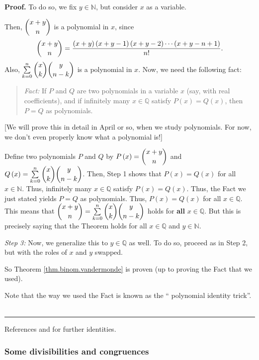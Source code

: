 \documentclass[numbers=enddot,12pt,final,onecolumn,notitlepage]{scrartcl}%
\numberwithin{exer}{subsection}
\theoremstyle{definition}
\newenvironment{statement}{\begin{quote}}{\end{quote}}
\newenvironment{proof}[1][Proof]{\noindent\textbf{#1.} }{\ \rule{0.5em}{0.5em}}
\let\sumnonlimits\sum
\renewcommand{\sum}{\sumnonlimits\limits}
\begin{document}
\begin{proof}
To do so, we fix $y\in\mathbb{N}$, but consider $x$ as a variable.

Then, $\dbinom{x+y}{n}$ is a polynomial in $x$, since%
\[
\dbinom{x+y}{n}=\dfrac{\left(  x+y\right)  \left(  x+y-1\right)  \left(
x+y-2\right)  \cdots\left(  x+y-n+1\right)  }{n!}.
\]
Also, $\sum\limits_{k=0}^{n}\dbinom{x}{k}\dbinom{y}{n-k}$ is a polynomial in
$x$. Now, we need the following fact:

\begin{statement}
\textit{Fact:} If $P$ and $Q$ are two polynomials in a variable $x$ (say, with
real coefficients), and if infinitely many $x\in\mathbb{Q}$ satisfy $P\left(
x\right)  =Q\left(  x\right)  $, then $P=Q$ as polynomials.
\end{statement}

[We will prove this in detail in April or so, when we study polynomials. For
now, we don't even properly know what a polynomial is!]

Define two polynomials $P$ and $Q$ by $P\left(  x\right)  =\dbinom{x+y}{n}$
and $Q\left(  x\right)  =\sum_{k=0}^{n}\dbinom{x}{k}\dbinom{y}{n-k}$. Then,
Step 1 shows that $P\left(  x\right)  =Q\left(  x\right)  $ for all
$x\in\mathbb{N}$. Thus, infinitely many $x\in\mathbb{Q}$ satisfy $P\left(
x\right)  =Q\left(  x\right)  $. Thus, the Fact we just stated yields $P=Q$ as
polynomials. Thus, $P\left(  x\right)  =Q\left(  x\right)  $ for all
$x\in\mathbb{Q}$. This means that $\dbinom{x+y}{n}=\sum\limits_{k=0}%
^{n}\dbinom{x}{k}\dbinom{y}{n-k}$ holds for \textbf{all} $x\in\mathbb{Q}$. But
this is precisely saying that the Theorem holds for all $x\in\mathbb{Q}$ and
$y\in\mathbb{N}$.

\textit{Step 3:} Now, we generalize this to $y\in\mathbb{Q}$ as well. To do
so, proceed as in Step 2, but with the roles of $x$ and $y$ swapped.

So Theorem \ref{thm.binom.vandermonde} is proven (up to proving the Fact that
we used).

Note that the way we used the Fact is known as the \textquotedblleft
polynomial identity trick\textquotedblright.
\end{proof}

References \cite{GKP} and \cite{detnotes} for further identities.

\subsubsection{Some divisibilities and congruences}
\end{document}
